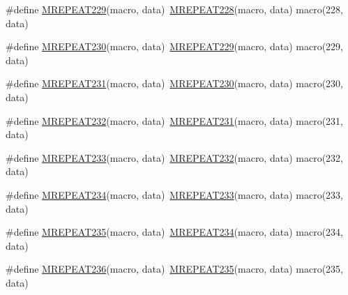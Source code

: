 \begin{DoxyCompactItemize}
\item 
\#define \mbox{\hyperlink{group__group__sam0__utils__mrepeat_ga0f5e93e8a648f55e0d193221c016771a}{M\+R\+E\+P\+E\+A\+T229}}(macro,  data)~\mbox{\hyperlink{group__group__sam0__utils__mrepeat_ga1976e9b1599c79c7dd75bdeefb924fba}{M\+R\+E\+P\+E\+A\+T228}}(macro, data)   macro(228, data)
\item 
\#define \mbox{\hyperlink{group__group__sam0__utils__mrepeat_ga4e98b44455fc8c2a542de807ef8f2535}{M\+R\+E\+P\+E\+A\+T230}}(macro,  data)~\mbox{\hyperlink{group__group__sam0__utils__mrepeat_ga0f5e93e8a648f55e0d193221c016771a}{M\+R\+E\+P\+E\+A\+T229}}(macro, data)   macro(229, data)
\item 
\#define \mbox{\hyperlink{group__group__sam0__utils__mrepeat_ga3f6882a8daac99c9571e37fd306c5451}{M\+R\+E\+P\+E\+A\+T231}}(macro,  data)~\mbox{\hyperlink{group__group__sam0__utils__mrepeat_ga4e98b44455fc8c2a542de807ef8f2535}{M\+R\+E\+P\+E\+A\+T230}}(macro, data)   macro(230, data)
\item 
\#define \mbox{\hyperlink{group__group__sam0__utils__mrepeat_ga7adad754d082734bb39548d811081bc3}{M\+R\+E\+P\+E\+A\+T232}}(macro,  data)~\mbox{\hyperlink{group__group__sam0__utils__mrepeat_ga3f6882a8daac99c9571e37fd306c5451}{M\+R\+E\+P\+E\+A\+T231}}(macro, data)   macro(231, data)
\item 
\#define \mbox{\hyperlink{group__group__sam0__utils__mrepeat_ga859709294d903b0f32c05695158fe8a6}{M\+R\+E\+P\+E\+A\+T233}}(macro,  data)~\mbox{\hyperlink{group__group__sam0__utils__mrepeat_ga7adad754d082734bb39548d811081bc3}{M\+R\+E\+P\+E\+A\+T232}}(macro, data)   macro(232, data)
\item 
\#define \mbox{\hyperlink{group__group__sam0__utils__mrepeat_gadff2111488b4bd5fc5d6407ec9dccefd}{M\+R\+E\+P\+E\+A\+T234}}(macro,  data)~\mbox{\hyperlink{group__group__sam0__utils__mrepeat_ga859709294d903b0f32c05695158fe8a6}{M\+R\+E\+P\+E\+A\+T233}}(macro, data)   macro(233, data)
\item 
\#define \mbox{\hyperlink{group__group__sam0__utils__mrepeat_ga5d3644eeaec5d2fe9d9055cc6581ed1d}{M\+R\+E\+P\+E\+A\+T235}}(macro,  data)~\mbox{\hyperlink{group__group__sam0__utils__mrepeat_gadff2111488b4bd5fc5d6407ec9dccefd}{M\+R\+E\+P\+E\+A\+T234}}(macro, data)   macro(234, data)
\item 
\#define \mbox{\hyperlink{group__group__sam0__utils__mrepeat_ga91157712363f58affa1ae6b2feb50747}{M\+R\+E\+P\+E\+A\+T236}}(macro,  data)~\mbox{\hyperlink{group__group__sam0__utils__mrepeat_ga5d3644eeaec5d2fe9d9055cc6581ed1d}{M\+R\+E\+P\+E\+A\+T235}}(macro, data)   macro(235, data)

\end{DoxyCompactItemize}
